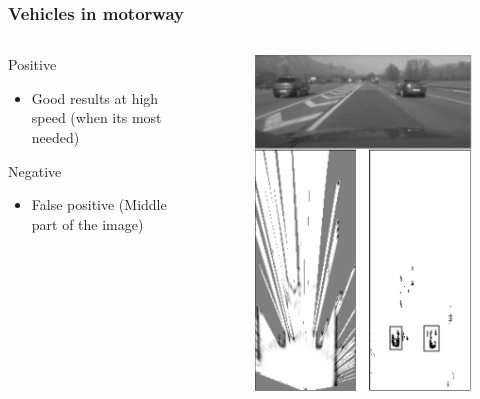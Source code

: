 \documentclass{beamer}
\begin{document}
\begin{frame}
	\end{frame}
	\begin{frame}
		\frametitle{Vehicles in motorway}
		\begin{columns}[t]
			\begin{column}[t]{5cm}
				\begin{exampleblock}{Positive}
				\begin{itemize}
				\item Good results at high speed (when its most needed)
				\end{itemize}
				\end{exampleblock}
								
				\begin{alertblock}{Negative}
				\begin{itemize}
				\item False positive (Middle part of the image)
				\end{itemize}
				\end{alertblock}					
			
			\end{column}
			\begin{column}[t]{5cm}
				\begin{figure}[h]
				\center
				\includegraphics[scale=0.55]{../img/fig:result:scenetwocarshighway}
				\end{figure}
			\end{column}
		\end{columns}		

	\end{frame}
	
\end{document}
